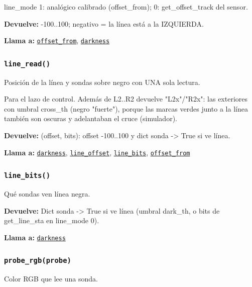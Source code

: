 line\_mode 1: analógico calibrado (offset\_from); 0: get\_offset\_track del sensor.

\noindent\textbf{Devuelve:} -100..100; negativo = la línea está a la IZQUIERDA.\par
\noindent\textbf{Llama a:} \hyperref[fn:hal:offset-from]{\texttt{offset\_\allowbreak{}from}}, \hyperref[fn:hal:darkness]{\texttt{darkness}}\par

\subsubsection{\texttt{line\_\allowbreak{}read()}}\label{fn:hal:line-read}
\noindent Posición de la línea y sondas sobre negro con UNA sola lectura.

Para el lazo de control. Además de L2..R2 devuelve "L2x"/"R2x": las exteriores con umbral cross\_th (negro "fuerte"), porque las marcas verdes junto a la línea también son oscuras y adelantaban el cruce (simulador).

\noindent\textbf{Devuelve:} (offset, bits): offset -100..100 y dict sonda -> True si ve línea.\par
\noindent\textbf{Llama a:} \hyperref[fn:hal:darkness]{\texttt{darkness}}, \hyperref[fn:hal:line-offset]{\texttt{line\_\allowbreak{}offset}}, \hyperref[fn:hal:line-bits]{\texttt{line\_\allowbreak{}bits}}, \hyperref[fn:hal:offset-from]{\texttt{offset\_\allowbreak{}from}}\par

\subsubsection{\texttt{line\_\allowbreak{}bits()}}\label{fn:hal:line-bits}
\noindent Qué sondas ven línea negra.

\noindent\textbf{Devuelve:} Dict sonda -> True si ve línea (umbral dark\_th, o bits de get\_line\_sta en line\_mode 0).\par
\noindent\textbf{Llama a:} \hyperref[fn:hal:darkness]{\texttt{darkness}}\par

\subsubsection{\texttt{probe\_\allowbreak{}rgb(probe)}}\label{fn:hal:probe-rgb}
\noindent Color RGB que lee una sonda.

